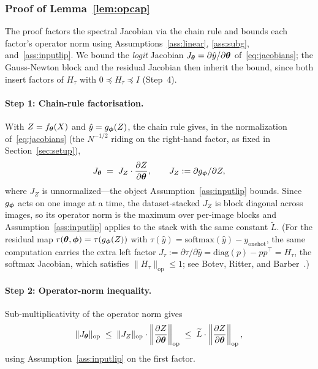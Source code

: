 \subsubsection{Proof of Lemma~\ref{lem:opcap}}

The proof factors the spectral Jacobian via the chain rule and
bounds each factor's operator norm using
Assumptions~\ref{ass:linear}, \ref{ass:subg}, and~\ref{ass:inputlip}.
We bound the \emph{logit} Jacobian $J_{\boldsymbol{\theta}} = \partial \hat{y} /
\partial {\boldsymbol{\theta}}$ of~\eqref{eq:jacobians}; the Gauss-Newton block and
the residual Jacobian then inherit the bound, since both insert
factors of $H_\tau$ with $0 \preceq H_\tau \preceq I$
(Step~4).

\paragraph{Step 1: Chain-rule factorisation.}
With $Z = f_{\boldsymbol{\theta}}(X)$ and $\hat{y} = g_{\boldsymbol{\phi}}(Z)$, the chain rule
gives, in the normalization of~\eqref{eq:jacobians} (the $N^{-1/2}$
riding on the right-hand factor, as fixed in
Section~\ref{sec:setup}),
\[
    J_{\boldsymbol{\theta}}
    \;=\; J_Z \cdot \frac{\partial Z}{\partial {\boldsymbol{\theta}}},
    \qquad J_Z := \partial g_{\boldsymbol{\phi}} / \partial Z ,
\]
where $J_Z$ is unnormalized---the object
Assumption~\ref{ass:inputlip} bounds. Since $g_{\boldsymbol{\phi}}$ acts on one
image at a time, the dataset-stacked $J_Z$ is block diagonal across
images, so its operator norm is the maximum over per-image blocks
and Assumption~\ref{ass:inputlip} applies to the stack with the same
constant $\widetilde{L}$.
(For the residual map $r({\boldsymbol{\theta}},{\boldsymbol{\phi}}) = \tau(g_{\boldsymbol{\phi}}(Z))$ with
$\tau(\hat{y}) = \mathrm{softmax}(\hat{y}) - y_{\mathrm{onehot}}$,
the same computation carries the extra left factor
$J_\tau := \partial \tau / \partial \hat{y} = \mathrm{diag}(p) -
p p^\top = H_\tau$, the softmax Jacobian, which satisfies
$\|H_\tau\|_{\mathrm{op}} \leq 1$; see Botev, Ritter, and
Barber~\cite{botev2017practical}.)

\paragraph{Step 2: Operator-norm inequality.}
Sub-multiplicativity of the operator norm gives
\[
    \|J_{\boldsymbol{\theta}}\|_{\mathrm{op}}
    \;\leq\; \|J_Z\|_{\mathrm{op}}
             \cdot \left\| \frac{\partial Z}{\partial {\boldsymbol{\theta}}} \right\|_{\mathrm{op}}
    \;\leq\; \widetilde{L} \cdot
             \left\| \frac{\partial Z}{\partial {\boldsymbol{\theta}}} \right\|_{\mathrm{op}},
\]
using Assumption~\ref{ass:inputlip} on the first factor.


